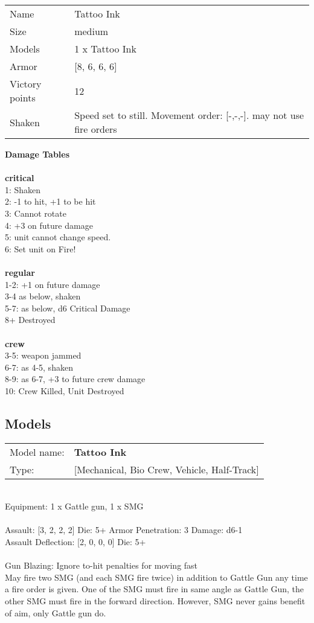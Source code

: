 \begin{tabular}{ll}
  Name & Tattoo Ink \\
  Size & medium\\
  Models & 1 x Tattoo Ink\\
  Armor & [8, 6, 6, 6]\\
  Victory points & 12\\
  Shaken & Speed set to still. Movement order: [-,-,-]. may not use fire orders\\
\end{tabular}




{\bf Damage Tables} \\
\ \\ {\bf critical } \\
1: Shaken \\
2: -1 to hit, +1 to be hit \\
3: Cannot rotate \\
4: +3 on future damage \\
5: unit cannot change speed. \\
6: Set unit on Fire! \\
\ \\ {\bf regular } \\
1-2: +1 on future damage \\
3-4 as below, shaken \\
5-7: as below, d6 Critical Damage \\
8+ Destroyed \\
\ \\ {\bf crew } \\
3-5: weapon jammed \\
6-7: as 4-5, shaken \\
8-9: as 6-7, +3 to future crew damage \\
10: Crew Killed, Unit Destroyed \\


\pagebreak

\subsection{ Models }

\begin{tabular}{ll}
Model name: & {\bf Tattoo Ink } \\
Type: & [Mechanical, Bio Crew, Vehicle, Half-Track] \\
\end{tabular}
\ \\
Equipment: 1 x Gattle gun, 1 x SMG \\
\ \\
Assault: [3, 2, 2, 2] Die: 5+ Armor Penetration: 3 Damage: d6-1 \\
Assault Deflection: [2, 0, 0, 0] Die: 5+\\
\indent  
\ \\
Gun Blazing: Ignore to-hit penalties for moving fast\\ 
May fire two SMG (and each SMG fire twice) in addition to Gattle Gun any time a fire order is given. One of the SMG must fire in same angle as Gattle Gun, the other SMG must fire in the forward direction. However, SMG never gains benefit of aim, only Gattle gun do.\\ 

